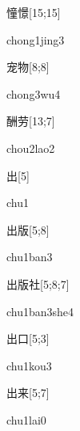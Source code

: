 \begin{verbete}{憧憬}[15;15]
\begin{pronuncia}{chong1jing3}
\end{pronuncia}
\end{verbete}

\begin{verbete}[chong3wu4]{宠物}[8;8]
\begin{pronuncia}{chong3wu4}
\end{pronuncia}
\end{verbete}

\begin{verbete}{酬劳}[13;7]
\begin{pronuncia}{chou2lao2}
\end{pronuncia}
\end{verbete}

\begin{verbete}[chu1]{出}[5]
\begin{pronuncia}{chu1}
\end{pronuncia}
\end{verbete}

\begin{verbete}{出版}[5;8]
\begin{pronuncia}{chu1ban3}
\end{pronuncia}
\end{verbete}

\begin{verbete}{出版社}[5;8;7]
\begin{pronuncia}{chu1ban3she4}
\end{pronuncia}
\end{verbete}

\begin{verbete}{出口}[5;3]
\begin{pronuncia}{chu1kou3}
\end{pronuncia}
\end{verbete}

\begin{verbete}[chu1qu0]{出来}[5;7]
\begin{pronuncia}{chu1lai0}
\end{pronuncia}
\end{verbete}

